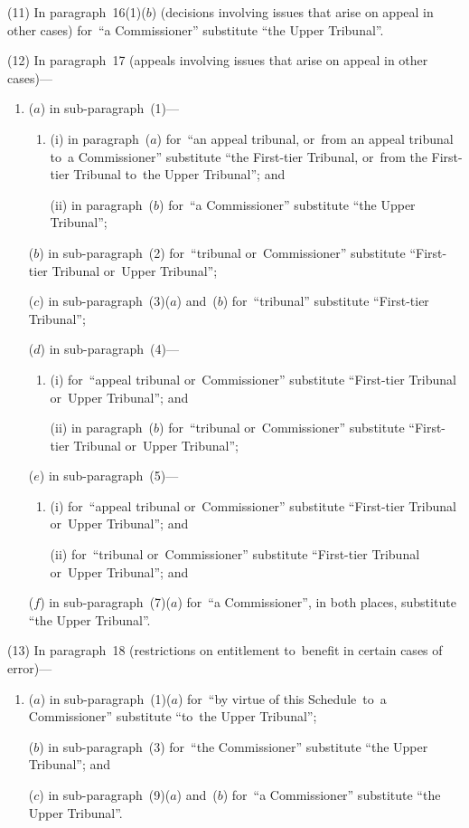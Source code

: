 \documentclass[12pt,a4paper]{article}
\begin{document}
(11) In paragraph~16(1)($b$)  (decisions involving issues that arise on appeal in other cases) for~“a Commissioner” substitute “the Upper Tribunal”.

(12) In paragraph~17 (appeals involving issues that arise on appeal in other cases)—
\begin{enumerate}\item[]
($a$) in sub-paragraph~(1)—
\begin{enumerate}\item[]
(i) in paragraph~($a$)  for~“an appeal tribunal, or~from an appeal tribunal to~a Commissioner” substitute “the First-tier Tribunal, or~from the First-tier Tribunal to~the Upper Tribunal”; and

(ii) in paragraph~($b$)  for~“a Commissioner” substitute “the Upper Tribunal”;
\end{enumerate}

($b$) in sub-paragraph~(2) for~“tribunal or~Commissioner” substitute “First-tier Tribunal or~Upper Tribunal”;

($c$) in sub-paragraph~(3)($a$)  and~($b$)  for~“tribunal” substitute “First-tier Tribunal”;

($d$) in sub-paragraph~(4)—
\begin{enumerate}\item[]
(i) for~“appeal tribunal or~Commissioner” substitute “First-tier Tribunal or~Upper Tribunal”; and

(ii) in paragraph~($b$)  for~“tribunal or~Commissioner” substitute “First-tier Tribunal or~Upper Tribunal”;
\end{enumerate}

($e$) in sub-paragraph~(5)—
\begin{enumerate}\item[]
(i) for~“appeal tribunal or~Commissioner” substitute “First-tier Tribunal or~Upper Tribunal”; and

(ii) for~“tribunal or~Commissioner” substitute “First-tier Tribunal or~Upper Tribunal”; and
\end{enumerate}

($f$) in sub-paragraph~(7)($a$)  for~“a Commissioner”, in both places, substitute “the Upper Tribunal”.
\end{enumerate}

(13) In paragraph~18 (restrictions on entitlement to~benefit in certain cases of error)—
\begin{enumerate}\item[]
($a$) in sub-paragraph~(1)($a$)  for~“by virtue of this Schedule~to~a Commissioner” substitute “to~the Upper Tribunal”;

($b$) in sub-paragraph~(3) for~“the Commissioner” substitute “the Upper Tribunal”; and

($c$) in sub-paragraph~(9)($a$)  and~($b$)  for~“a Commissioner” substitute “the Upper Tribunal”.
\end{enumerate}
\end{document}
